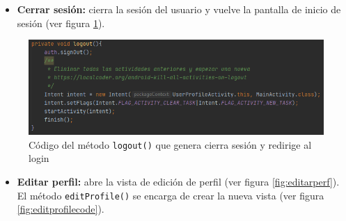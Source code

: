     
\begin{itemize}    
    \begin{itemize}
        \item \textbf{Cerrar sesión:} cierra la sesión del usuario y vuelve la pantalla de inicio de sesión (ver figura \ref{fig:logout}).
    \end{itemize}
\end{itemize}
\begin{figure}[H]
    \centering
    \includegraphics[width=\textwidth]{Images/Capitulo7/logout.png}
    \caption{Código del método \texttt{logout()} que genera cierra sesión y redirige al login}
    \label{fig:logout}
\end{figure}

\begin{itemize}    
    \begin{itemize}
        \item \textbf{Editar perfil:} abre la vista de edición de perfil (ver figura \ref{fig:editarperf}). El método \texttt{editProfile()} se encarga de crear la nueva vista (ver figura \ref{fig:editprofilecode}).
    \end{itemize}
\end{itemize}

